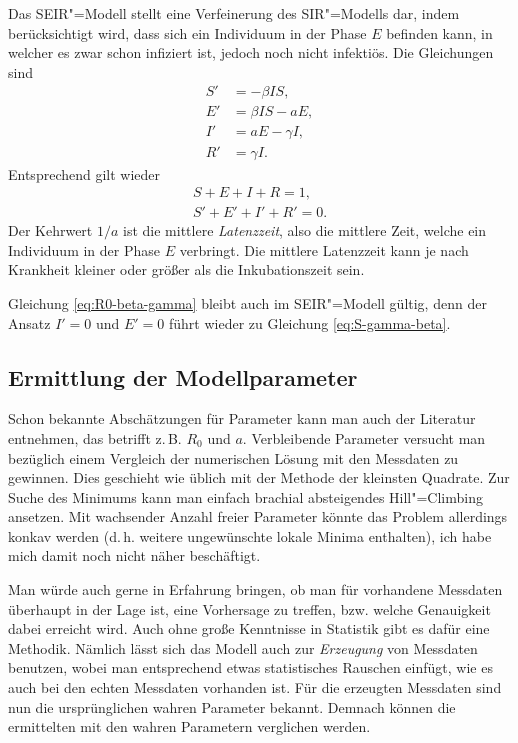 \documentclass[a4paper,11pt,fleqn,twocolumn,twoside,dvipdfmx]{scrartcl}
\numberwithin{equation}{section}
\begin{document}
Das SEIR"=Modell stellt eine Verfeinerung des SIR"=Modells dar, indem
berücksichtigt wird, dass sich ein Individuum in der
Phase $E$ befinden kann, in welcher es zwar schon infiziert ist,
jedoch noch nicht infektiös. Die Gleichungen sind%
\begin{align}
\label{SEIR-System-S} S' &= -\beta IS,\\
\label{SEIR-System-E} E' &= \beta IS-aE,\\
\label{SEIR-System-I} I' &= aE-\gamma I,\\
\label{SEIR-System-R} R' &= \gamma I.
\end{align}
Entsprechend gilt wieder
\begin{gather}
S+E+I+R=1,\\
S'+E'+I'+R'=0.
\end{gather}
Der Kehrwert $1/a$ ist die mittlere \emph{Latenzzeit}, also die mittlere
Zeit, welche ein Individuum in der Phase $E$ verbringt. Die mittlere
Latenzzeit kann je nach Krankheit kleiner oder größer als die
Inkubationszeit sein.

Gleichung \eqref{eq:R0-beta-gamma} bleibt auch im SEIR"=Modell gültig,
denn der Ansatz $I'=0$ und $E'=0$ führt wieder zu Gleichung
\eqref{eq:S-gamma-beta}.

\subsection{Ermittlung der Modellparameter}

Schon bekannte Abschätzungen für Parameter kann man auch der Literatur
entnehmen, das betrifft z.\,B. $R_0$ und $a$. Verbleibende Parameter
versucht man bezüglich einem Vergleich der numerischen Lösung mit
den Messdaten zu gewinnen. Dies geschieht wie üblich mit der
Methode der kleinsten Quadrate. Zur Suche des Minimums kann man einfach
brachial absteigendes Hill"=Climbing ansetzen. Mit wachsender Anzahl
freier Parameter könnte das Problem allerdings konkav werden (d.\,h.
weitere ungewünschte lokale Minima enthalten), ich habe
mich damit noch nicht näher beschäftigt.

Man würde auch gerne in Erfahrung bringen, ob man für vorhandene
Messdaten überhaupt in der Lage ist, eine Vorhersage zu treffen,
bzw. welche Genauigkeit dabei erreicht wird. Auch ohne große Kenntnisse
in Statistik gibt es dafür eine Methodik. Nämlich lässt sich
das Modell auch zur \emph{Erzeugung} von Messdaten benutzen, wobei
man entsprechend etwas statistisches Rauschen einfügt, wie es auch
bei den echten Messdaten vorhanden ist. Für die erzeugten Messdaten
sind nun die ursprünglichen wahren Parameter bekannt. Demnach können
die ermittelten mit den wahren Parametern verglichen werden.
\end{document}

